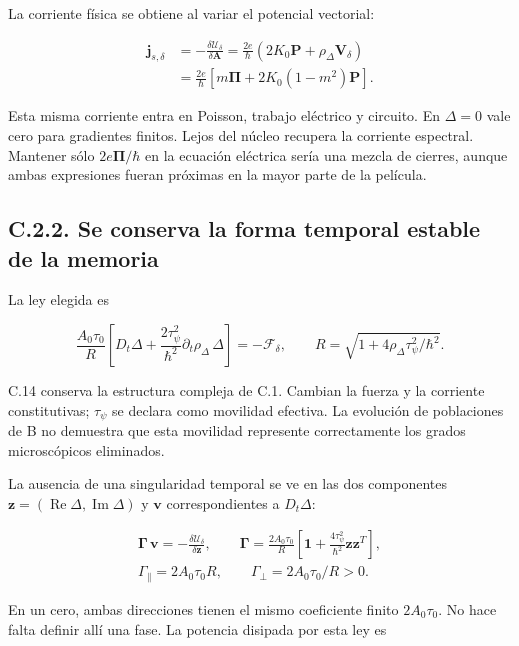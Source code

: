 \documentclass[
  spanish,
  10pt,
  a4paper,
]{article}
\begin{document}
La corriente física se obtiene al variar el potencial vectorial:

\[
\begin{aligned}
\mathbf j_{s,\delta}
&=-\frac{\delta\mathcal U_\delta}{\delta\mathbf A}
=\frac{2e}{\hbar}\left(2K_0\mathbf P+\rho_\Delta\mathbf V_\delta\right)\\
&=\frac{2e}{\hbar}\left[m\boldsymbol\Pi
+2K_0(1-m^2)\mathbf P\right].
\end{aligned}\tag{C.13}
\]

Esta misma corriente entra en Poisson, trabajo eléctrico y circuito. En
\(\Delta=0\) vale cero para gradientes finitos. Lejos del núcleo
recupera la corriente espectral. Mantener sólo
\(2e\boldsymbol\Pi/\hbar\) en la ecuación eléctrica sería una mezcla de
cierres, aunque ambas expresiones fueran próximas en la mayor parte de
la película.

\subsection{C.2.2. Se conserva la forma temporal estable de la
memoria}\label{c.2.2.-se-conserva-la-forma-temporal-estable-de-la-memoria}

La ley elegida es

\[
\frac{A_0\tau_0}{R}\left[
D_t\Delta+\frac{2\tau_\psi^2}{\hbar^2}\partial_t\rho_\Delta\,\Delta
\right]=-\mathscr F_\delta,
\qquad R=\sqrt{1+4\rho_\Delta\tau_\psi^2/\hbar^2}.
\tag{C.14}
\]

C.14 conserva la estructura compleja de C.1. Cambian la fuerza y la
corriente constitutivas; \(\tau_\psi\) se declara como movilidad
efectiva. La evolución de poblaciones de B no demuestra que esta
movilidad represente correctamente los grados microscópicos eliminados.

La ausencia de una singularidad temporal se ve en las dos componentes
\(\mathbf z=(\operatorname{Re}\Delta,\operatorname{Im}\Delta)\) y
\(\mathbf v\) correspondientes a \(D_t\Delta\):

\[
\begin{gathered}
\boldsymbol\Gamma\,\mathbf v=-\frac{\delta\mathcal U_\delta}{\delta\mathbf z},\qquad
\boldsymbol\Gamma=\frac{2A_0\tau_0}{R}
\left[\mathbf1+\frac{4\tau_\psi^2}{\hbar^2}\mathbf z\mathbf z^T\right],\\
\Gamma_{\parallel}=2A_0\tau_0R,\qquad
\Gamma_{\perp}=2A_0\tau_0/R>0.
\end{gathered}\tag{C.15}
\]

En un cero, ambas direcciones tienen el mismo coeficiente finito
\(2A_0\tau_0\). No hace falta definir allí una fase. La potencia
disipada por esta ley es
\end{document}
